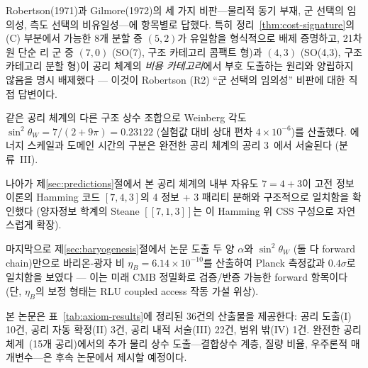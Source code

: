 \documentclass[entropy,article,submit,pdftex,oneauthor]{Definitions/mdpi}
\begin{document}
Robertson(1971)과 Gilmore(1972)의 세 가지 비판---물리적 동기 부재, 군 선택의 임의성, 측도 선택의 비유일성---에 항목별로 답했다. 특히 정리~\ref{thm:cost-signature}의 (C) 부분에서 가능한 8개 분할 중 $(5,2)$가 유일함을 형식적으로 배제 증명하고, 21차원 단순 리 군 중 $(7,0)$ (SO(7), 구조 카테고리 콤팩트 형)과 $(4,3)$ (SO(4,3), 구조 카테고리 분할 형)이 공리 체계의 \emph{비용 카테고리}에서 부호 도출하는 원리와 양립하지 않음을 명시 배제했다 — 이것이 Robertson (R2) ``군 선택의 임의성'' 비판에 대한 직접 답변이다.

같은 공리 체계의 다른 구조 상수 조합으로 Weinberg 각도 $\sin^2\theta_W = 7/(2+9\pi) = 0.23122$ (실험값 대비 상대 편차 $4 \times 10^{-6}$)를 산출했다. 에너지 스케일과 도메인 시간의 구분은 완전한 공리 체계의 공리 3~\cite{han2026}에서 서술된다 (분류~III).

나아가 제\ref{sec:predictions}절에서 본 공리 체계의 내부 자유도 $7 = 4 + 3$이 고전 정보이론의 Hamming 코드 $[7,4,3]$의 4 정보 + 3 패리티 분해와 구조적으로 일치함을 확인했다 (양자정보 학계의 Steane $[[7,1,3]]$는 이 Hamming 위 CSS 구성으로 자연스럽게 확장).

마지막으로 제\ref{sec:baryogenesis}절에서 논문 도출 두 양 $\alpha$와 $\sin^2\theta_W$ (둘 다 forward chain)만으로 바리온-광자 비 $\eta_B = 6.14 \times 10^{-10}$를 산출하여 Planck 측정값과 $0.4\sigma$로 일치함을 보였다 — 이는 미래 CMB 정밀화로 검증/반증 가능한 forward 항목이다 (단, $\eta_B$의 보정 형태는 RLU coupled access 작동 가설 위상).

본 논문은 표~\ref{tab:axiom-results}에 정리된 36건의 산출물을 제공한다: 공리 도출(I) 10건, 공리 자동 확정(II) 3건, 공리 내적 서술(III) 22건, 범위 밖(IV) 1건. 완전한 공리 체계~\cite{han2026}(15개 공리)에서의 추가 물리 상수 도출---결합상수 계층, 질량 비율, 우주론적 매개변수---은 후속 논문에서 제시할 예정이다.

\vspace{6pt}





\end{document}
